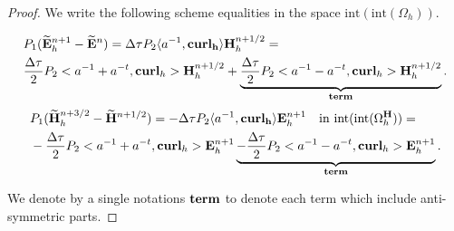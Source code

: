 \documentclass[12pt,reqno]{amsart}
\newcommand{\curl}{{\bf curl}}
\newcommand{\acurl}{\langle a^{-1},{\bf curl_h}\rangle}
\newcommand{\e}{{\bf E}}
\newcommand{\h}{{\bf H}}
\theoremstyle{definition}
\numberwithin{equation}{section}
\newcommand{\intr}[1]{\mathrm{int}(#1)}
\def\Gwh{\Omega_h}
\begin{document}
\begin{proof}
	
	We write the following scheme equalities in the space $\intr{\intr\Gwh}$.
	
	\begin{align*}
		&
		P_1(\widetilde{\e}_h^{n+1} -\widetilde{\e}^{n})=
		\Delta \tau P_2 \acurl \h_h^{n+1/2}=\\&
		\frac{\Delta \tau}{2}P_2<a^{-1}+a^{-t},\curl_h>\h_h^{n+1/2}+
			\underbrace{\frac{\Delta \tau}{2}P_2<a^{-1}-a^{-t},\curl_h>\h_h^{n+1/2}}_{{\bf term }}.
	\end{align*}
	\begin{align*}
		&
		P_1(\widetilde{\h}_h^{n+3/2} -\widetilde{\h}^{n+1/2})
		=
		-\Delta \tau P_2 \acurl \e_h^{n+1}  \quad \mathrm{in} \  \intr{\intr{\Gwh^\h}}=\\&
		-\frac{\Delta \tau}{2}P_2<a^{-1}+a^{-t},\curl_h>\e_h^{n+1}
		\underbrace{	-\frac{\Delta \tau}{2}P_2<a^{-1}-a^{-t},\curl_h>\e_h^{n+1}}_{{\bf term  }}.
	\end{align*}

We denote by a single notations ${\bf term}$ to denote each term which include anti-symmetric parts.
	


\end{proof}
\end{document}
